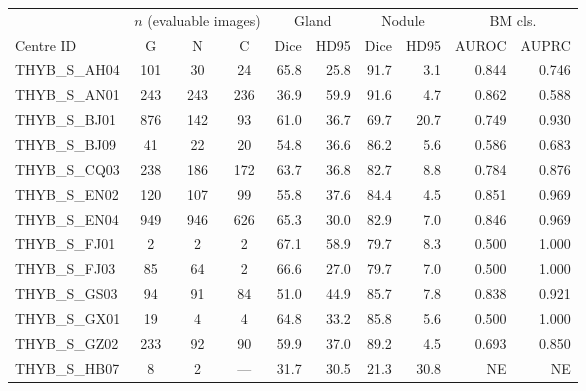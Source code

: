 
\begin{responsetable}
\caption{}
\begin{adjustbox}{max width=\textwidth,center}
\begin{tabular}{@{}l *{3}{c} *{6}{r} @{}}
\toprule
 & \multicolumn{3}{c}{$n$ (evaluable images)} & \multicolumn{2}{c}{Gland} & \multicolumn{2}{c}{Nodule} & \multicolumn{2}{c}{BM cls.} \\
\cmidrule(lr){2-4}\cmidrule(lr){5-6}\cmidrule(lr){7-8}\cmidrule(lr){9-10}
{Centre ID} & G & N & C & Dice & HD95 & Dice & HD95 & AUROC & AUPRC \\
\midrule
THYB\_S\_AH04 & 101 & 30 & 24 & 65.8 & 25.8 & 91.7 & 3.1 & 0.844 & 0.746 \\
THYB\_S\_AN01 & 243 & 243 & 236 & 36.9 & 59.9 & 91.6 & 4.7 & 0.862 & 0.588 \\
THYB\_S\_BJ01 & 876 & 142 & 93 & 61.0 & 36.7 & 69.7 & 20.7 & 0.749 & 0.930 \\
THYB\_S\_BJ09 & 41 & 22 & 20 & 54.8 & 36.6 & 86.2 & 5.6 & 0.586 & 0.683 \\
THYB\_S\_CQ03 & 238 & 186 & 172 & 63.7 & 36.8 & 82.7 & 8.8 & 0.784 & 0.876 \\
THYB\_S\_EN02 & 120 & 107 & 99 & 55.8 & 37.6 & 84.4 & 4.5 & 0.851 & 0.969 \\
THYB\_S\_EN04 & 949 & 946 & 626 & 65.3 & 30.0 & 82.9 & 7.0 & 0.846 & 0.969 \\
THYB\_S\_FJ01 & 2 & 2 & 2 & 67.1 & 58.9 & 79.7 & 8.3 & 0.500 & 1.000 \\
THYB\_S\_FJ03 & 85 & 64 & 2 & 66.6 & 27.0 & 79.7 & 7.0 & 0.500 & 1.000 \\
THYB\_S\_GS03 & 94 & 91 & 84 & 51.0 & 44.9 & 85.7 & 7.8 & 0.838 & 0.921 \\
THYB\_S\_GX01 & 19 & 4 & 4 & 64.8 & 33.2 & 85.8 & 5.6 & 0.500 & 1.000 \\
THYB\_S\_GZ02 & 233 & 92 & 90 & 59.9 & 37.0 & 89.2 & 4.5 & 0.693 & 0.850 \\
THYB\_S\_HB07 & 8 & 2 & --- & 31.7 & 30.5 & 21.3 & 30.8 & NE & NE \\

\end{tabular}
\end{adjustbox}
\end{responsetable}
